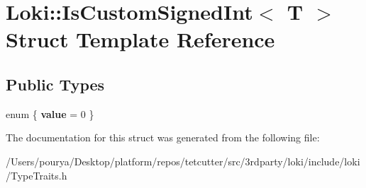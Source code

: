 \hypertarget{structLoki_1_1IsCustomSignedInt}{}\section{Loki\+:\+:Is\+Custom\+Signed\+Int$<$ T $>$ Struct Template Reference}
\label{structLoki_1_1IsCustomSignedInt}
\subsection*{Public Types}
\begin{DoxyCompactItemize}
\item 
\hypertarget{structLoki_1_1IsCustomSignedInt_a3bd2da8d0b2aa15e1ffc29cc80e91c51}{}enum \{ {\bfseries value} = 0
 \}\label{structLoki_1_1IsCustomSignedInt_a3bd2da8d0b2aa15e1ffc29cc80e91c51}

\end{DoxyCompactItemize}


The documentation for this struct was generated from the following file\+:\begin{DoxyCompactItemize}
\item 
/\+Users/pourya/\+Desktop/platform/repos/tetcutter/src/3rdparty/loki/include/loki/Type\+Traits.\+h\end{DoxyCompactItemize}
